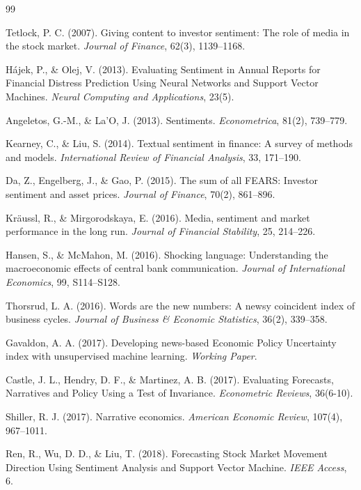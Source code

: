 \documentclass[11pt,twocolumn]{article}
\begin{document}
\begin{thebibliography}{99}

 Tetlock, P. C. (2007). Giving content to investor sentiment: The role of media in the stock market. \textit{Journal of Finance}, 62(3), 1139--1168.

 Hájek, P., \& Olej, V. (2013). Evaluating Sentiment in Annual Reports for Financial Distress Prediction Using Neural Networks and Support Vector Machines. \textit{Neural Computing and Applications}, 23(5).

 Angeletos, G.-M., \& La'O, J. (2013). Sentiments. \textit{Econometrica}, 81(2), 739--779.

 Kearney, C., \& Liu, S. (2014). Textual sentiment in finance: A survey of methods and models. \textit{International Review of Financial Analysis}, 33, 171--190.

 Da, Z., Engelberg, J., \& Gao, P. (2015). The sum of all FEARS: Investor sentiment and asset prices. \textit{Journal of Finance}, 70(2), 861--896.

 Kräussl, R., \& Mirgorodskaya, E. (2016). Media, sentiment and market performance in the long run. \textit{Journal of Financial Stability}, 25, 214--226.

 Hansen, S., \& McMahon, M. (2016). Shocking language: Understanding the macroeconomic effects of central bank communication. \textit{Journal of International Economics}, 99, S114--S128.

 Thorsrud, L. A. (2016). Words are the new numbers: A newsy coincident index of business cycles. \textit{Journal of Business \& Economic Statistics}, 36(2), 339--358.

 Gavaldon, A. A. (2017). Developing news-based Economic Policy Uncertainty index with unsupervised machine learning. \textit{Working Paper}.

 Castle, J. L., Hendry, D. F., \& Martinez, A. B. (2017). Evaluating Forecasts, Narratives and Policy Using a Test of Invariance. \textit{Econometric Reviews}, 36(6-10).

 Shiller, R. J. (2017). Narrative economics. \textit{American Economic Review}, 107(4), 967--1011.

 Ren, R., Wu, D. D., \& Liu, T. (2018). Forecasting Stock Market Movement Direction Using Sentiment Analysis and Support Vector Machine. \textit{IEEE Access}, 6.


\end{thebibliography}
\end{document}
